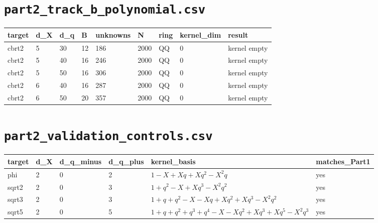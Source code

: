 \documentclass[10pt]{article}
\begin{document}
\section*{\texttt{part2\_track\_b\_polynomial.csv}}
{\footnotesize
\begin{longtable}{@{}lllllllll@{}}
\toprule
\textbf{target} & \textbf{d\_X} & \textbf{d\_q} & \textbf{B} & \textbf{unknowns} & \textbf{N} & \textbf{ring} & \textbf{kernel\_dim} & \textbf{result} \\
\midrule\endhead
cbrt2 & 5 & 30 & 12 & 186 & 2000 & QQ & 0 & kernel empty \\
cbrt2 & 5 & 40 & 16 & 246 & 2000 & QQ & 0 & kernel empty \\
cbrt2 & 5 & 50 & 16 & 306 & 2000 & QQ & 0 & kernel empty \\
cbrt2 & 6 & 40 & 16 & 287 & 2000 & QQ & 0 & kernel empty \\
cbrt2 & 6 & 50 & 20 & 357 & 2000 & QQ & 0 & kernel empty \\
\bottomrule
\end{longtable}}


\section*{\texttt{part2\_validation\_controls.csv}}
{\footnotesize
\begin{longtable}{@{}llllll@{}}
\toprule
\textbf{target} & \textbf{d\_X} & \textbf{d\_q\_minus} & \textbf{d\_q\_plus} & \textbf{kernel\_basis} & \textbf{matches\_Part1} \\
\midrule\endhead
phi & 2 & 0 & 2 & $1 - X + X q + X q^{2} - X^{2} q$ & yes \\
sqrt2 & 2 & 0 & 3 & $1 + q^{2} - X + X q^{3} - X^{2} q^{2}$ & yes \\
sqrt3 & 2 & 0 & 3 & $1 + q + q^{2} - X - X q + X q^{2} + X q^{3} - X^{2} q^{2}$ & yes \\
sqrt5 & 2 & 0 & 5 & $1 + q + q^{2} + q^{3} + q^{4} - X - X q^{2} + X q^{3} + X q^{5} - X^{2} q^{3}$ & yes \\
\bottomrule
\end{longtable}}
\end{document}
